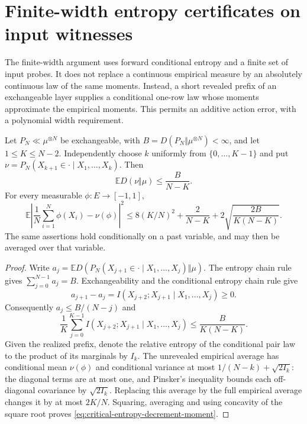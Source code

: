 \section{Finite-width entropy certificates on input witnesses}
\label{sec:critical-finite-witness}

The finite-width argument uses forward conditional entropy and a finite
set of input probes. It does not replace a continuous empirical measure
by an absolutely continuous law of the same moments. Instead, a short
revealed prefix of an exchangeable layer supplies a conditional one-row
law whose moments approximate the empirical moments. This permits an
additive action error, with a polynomial width requirement.

\begin{lemma}
\label{lem:critical-entropy-decrement}
Let $P_N\ll\mu^{\otimes N}$ be exchangeable, with
$B=D(P_N\Vert\mu^{\otimes N})<\infty$, and let
$1\le K\le N-2$. Independently choose $k$ uniformly from
$\{0,\ldots,K-1\}$ and put
$\nu=P_N(X_{k+1}\in\cdot\mid X_1,\ldots,X_k)$.
Then
\[
 \mathbb E D(\nu\Vert\mu)\le\frac B{N-K}.
\]
For every measurable $\phi:E\to[-1,1]$,
\begin{equation}\label{eq:critical-entropy-decrement-moment}
 \mathbb E\left|\frac1N\sum_{i=1}^N\phi(X_i)-\nu(\phi)\right|^2
 \le8(K/N)^2+\frac2{N-K}
                 +2\sqrt{\frac{2B}{K(N-K)}}.
\end{equation}
The same assertions hold conditionally on a past variable, and may
then be averaged over that variable.
\end{lemma}

\begin{proof}
Write
$a_j=\mathbb E D(P_N(X_{j+1}\in\cdot\mid X_1,\ldots,X_j)
\Vert\mu)$. The entropy chain rule gives $\sum_{j=0}^{N-1}a_j=B$.
Exchangeability and the conditional entropy chain rule give
\[
 a_{j+1}-a_j
 =I(X_{j+2};X_{j+1}\mid X_1,\ldots,X_j)\ge0.
\]
Consequently $a_j\le B/(N-j)$ and
\[
 \frac1K\sum_{j=0}^{K-1}
 I(X_{j+2};X_{j+1}\mid X_1,\ldots,X_j)
 \le\frac B{K(N-K)}.
\]
Given the realized prefix, denote the relative entropy of the
conditional pair law to the product of its marginals by $I_k$.
The unrevealed empirical average has conditional mean $\nu(\phi)$
and conditional variance at most
$1/(N-k)+\sqrt{2I_k}$: the diagonal terms are at most one, and
Pinsker's inequality bounds each off-diagonal covariance by
$\sqrt{2I_k}$. Replacing this average by the full empirical average
changes it by at most $2K/N$. Squaring, averaging and using concavity
of the square root proves
\eqref{eq:critical-entropy-decrement-moment}.
\end{proof}

